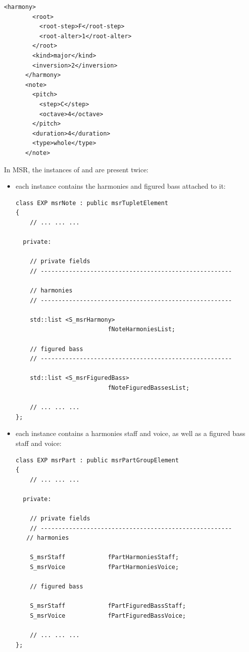 \begin{lstlisting}[language=MusicXML]
      <harmony>
        <root>
          <root-step>F</root-step>
          <root-alter>1</root-alter>
        </root>
        <kind>major</kind>
        <inversion>2</inversion>
      </harmony>
      <note>
        <pitch>
          <step>C</step>
          <octave>4</octave>
        </pitch>
        <duration>4</duration>
        <type>whole</type>
      </note>
\end{lstlisting}

In MSR, the instances of  and  are present twice:
\begin{itemize}
\item each  instance contains the harmonies and figured bass attached to it:
\begin{lstlisting}[language=CPlusPlus]
class EXP msrNote : public msrTupletElement
{
	// ... ... ...

  private:

    // private fields
    // ------------------------------------------------------

    // harmonies
    // ------------------------------------------------------

    std::list <S_msrHarmony>
                          fNoteHarmoniesList;

    // figured bass
    // ------------------------------------------------------

    std::list <S_msrFiguredBass>
                          fNoteFiguredBassesList;

	// ... ... ...
};
\end{lstlisting}

\item each  instance contains a harmonies staff and voice, as well as a figured bass staff and voice:
\begin{lstlisting}[language=CPlusPlus]
class EXP msrPart : public msrPartGroupElement
{
	// ... ... ...

  private:

    // private fields
    // ------------------------------------------------------
   // harmonies

    S_msrStaff            fPartHarmoniesStaff;
    S_msrVoice            fPartHarmoniesVoice;

    // figured bass

    S_msrStaff            fPartFiguredBassStaff;
    S_msrVoice            fPartFiguredBassVoice;

	// ... ... ...
};
\end{lstlisting}
\end{itemize}

